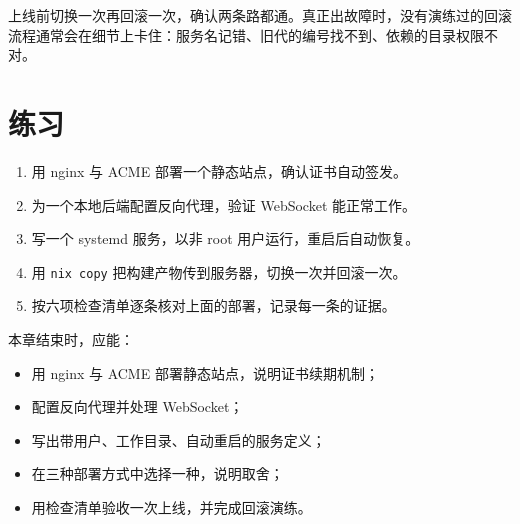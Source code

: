 \begin{notebox}[不要跳过回滚演练]
上线前切换一次再回滚一次，确认两条路都通。真正出故障时，没有演练过的回滚流程通常会在细节上卡住：服务名记错、旧代的编号找不到、依赖的目录权限不对。
\end{notebox}

\section{练习}

\begin{enumerate}
  \item 用 nginx 与 ACME 部署一个静态站点，确认证书自动签发。
  \item 为一个本地后端配置反向代理，验证 WebSocket 能正常工作。
  \item 写一个 systemd 服务，以非 root 用户运行，重启后自动恢复。
  \item 用 \texttt{nix copy} 把构建产物传到服务器，切换一次并回滚一次。
  \item 按六项检查清单逐条核对上面的部署，记录每一条的证据。
\end{enumerate}

\begin{checkpoint}
本章结束时，应能：
\begin{itemize}
  \item 用 nginx 与 ACME 部署静态站点，说明证书续期机制；
  \item 配置反向代理并处理 WebSocket；
  \item 写出带用户、工作目录、自动重启的服务定义；
  \item 在三种部署方式中选择一种，说明取舍；
  \item 用检查清单验收一次上线，并完成回滚演练。
\end{itemize}
\end{checkpoint}
